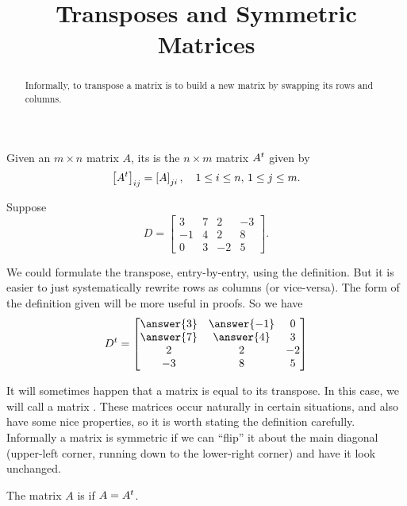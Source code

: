 \documentclass{ximera}
\title{Transposes and Symmetric Matrices}
\begin{document}
\begin{abstract}
  Informally, to transpose a matrix is to build a new matrix by swapping its rows and columns.
\end{abstract}
\maketitle


\begin{definition}

  Given an $m\times n$ matrix $A$, its  is the $n\times m$ matrix $A^{t}$ given by
  \[
    \left\lbrack A^{t}\right\rbrack_{ij}=\left\lbrack A\right\rbrack_{ji},\quad 1\leq i\leq n,\,1\leq j\leq m.
  \]
\end{definition}

\begin{example}

Suppose
\[
D=
\begin{bmatrix}
3&7&2&-3\\
-1&4&2&8\\
0&3&-2&5
\end{bmatrix}.
\]

We could formulate the transpose, entry-by-entry, using the
definition.  But it is easier to just systematically rewrite rows as
columns (or vice-versa).  The form of the definition given will be
more useful in proofs.  So we have
\[
  \transpose{D}=
  \begin{bmatrix}
    \answer{3}&\answer{-1}&0\\
    \answer{7}&\answer{4}&3\\
    2&2&-2\\
    -3&8&5
  \end{bmatrix}
\]

\end{example}

It will sometimes happen that a matrix is equal to its transpose.  In
this case, we will call a matrix .  These matrices
occur naturally in certain situations, and also have some nice
properties, so it is worth stating the definition carefully.
Informally a matrix is symmetric if we can ``flip'' it about the main
diagonal (upper-left corner, running down to the lower-right corner)
and have it look unchanged.

\begin{definition}
The matrix $A$ is  if $A=A^{t}$.
\end{definition}
\end{document}
